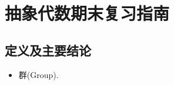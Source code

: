 \documentclass{solutions-cn}
\begin{document}
    
\section{抽象代数期末复习指南}

\subsection{定义及主要结论}
    \begin{itemize}
        \item 群(Group).
        
    \end{itemize}
\end{document}
